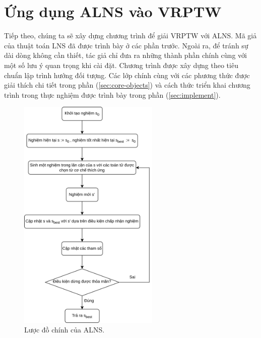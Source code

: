 \section{Ứng dụng ALNS vào VRPTW}

Tiếp theo, chúng ta sẽ xây dựng chương trình để giải VRPTW với ALNS. Mã giả của thuật toán LNS đã được trình bày ở các phần trước. Ngoài ra, để tránh sự dài dòng không cần thiết, tác giả chỉ đưa ra những thành phần chính cùng với một số lưu ý quan trọng khi cài đặt. Chương trình được xây dựng theo tiêu chuẩn lập trình hướng đối tượng. Các lớp chính cùng với các phương thức được giải thích chi tiết trong phần (\ref{sec:core-objects}) và cách thức triển khai chương trình trong thực nghiệm được trình bày trong phần (\ref{sec:implement}).

\begin{figure}[H] %
  \centering %
  \includegraphics[width=0.6\textwidth]{figures/ALNS-flowchart.png} 
  \caption{Lược đồ chính của ALNS.} 
\end{figure}



